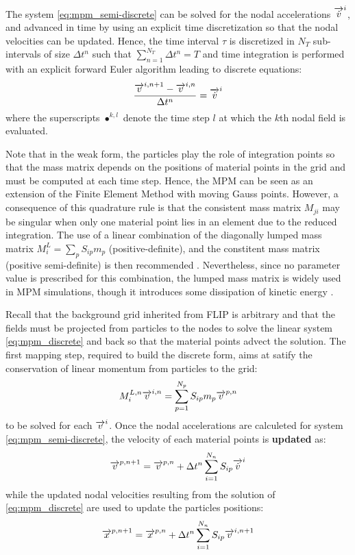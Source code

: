 The system \eqref{eq:mpm_semi-discrete} can be solved for the nodal accelerations ${\overrightarrow{\dot{v}}}^i$, and advanced in time by using an explicit time discretization so that the nodal velocities can be updated. Hence, the time interval $\tau$ is discretized in $N_T$ sub-intervals of size $\Delta t^n$ such that $\sum_{n=1}^{N_T} \Delta t^n = T$ and time integration is performed with an explicit forward Euler algorithm leading to discrete equations:
\begin{equation}
  \label{eq:mpm_discrete}
  \frac{{\overrightarrow{v}}^{i,n+1}-{\overrightarrow{v}}^{i,n}}{\Delta t^n} = {\overrightarrow{\dot{v}}}^i
\end{equation}
where the superscripts $\bullet^{k,l}$ denote the time step $l$ at which the $k$th nodal field is evaluated. 

Note that in the weak form, the particles play the role of integration points so that the mass matrix depends on the positions of material points in the grid and must be computed at each time step. Hence, the MPM can be seen as an extension of the Finite Element Method with moving Gauss points. However, a consequence of this quadrature rule is that the consistent mass matrix $M_{ji}$ may be singular when only one material point lies in an element due to the reduced integration. The use of a linear combination of the diagonally lumped mass matrix $M^L_i=\sum_p S_{ip}m_p$ (positive-definite), and the constitent mass matrix (positive semi-definite) is then recommended \cite{Love}. Nevertheless, since no parameter value is prescribed for this combination, the lumped mass matrix is widely used in MPM simulations, though it introduces some dissipation of kinetic energy \cite{Mass_Flip}.  

Recall that the background grid inherited from FLIP is arbitrary and that the fields must be projected from particles to the nodes to solve the linear system \eqref{eq:mpm_discrete} and back so that the material points advect the solution. The first mapping step, required to build the discrete form,
aims at satify the conservation of linear momentum from particles to the grid:
\begin{equation}
  \label{eq:particles2nodes}
  M^{L,n}_i {\overrightarrow{v}}^{i,n} = \sum_{p=1}^{N_p} S_{ip}m_p {\overrightarrow{v}}^{p,n}
\end{equation}
to be solved for each ${\overrightarrow{v}}^i$. Once the nodal accelerations are calculeted for system \eqref{eq:mpm_semi-discrete}, the velocity of each material points is \textbf{updated} as:
\begin{equation}
  \label{eq:mp_velocity_update}
  {\overrightarrow{v}}^{p,n+1}= {\overrightarrow{v}}^{p,n}+ \Delta t^n \sum_{i=1}^{N_n} S_{ip}{\overrightarrow{\dot{v}}}^{i}
\end{equation}
while the updated nodal velocities resulting from the solution of \eqref{eq:mpm_discrete} are used to update the particles positions:
\begin{equation}
  \label{eq:position_update}
  {\overrightarrow{x}}^{p,n+1}={\overrightarrow{x}}^{p,n} + \Delta t^n\sum_{i=1}^{N_n} S_{ip}{\overrightarrow{v}}^{i,n+1} 
\end{equation}

